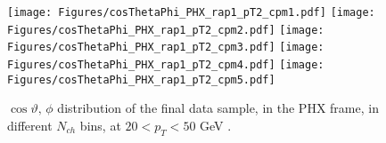 \documentclass[12pt]{article}
\newcommand{\pt}{$p_{\mathrm{T}}$}
\begin{document}
\begin{figure}[htbp]
\centering
\texttt{[image: Figures/cosThetaPhi\_PHX\_rap1\_pT2\_cpm1.pdf]}
\texttt{[image: Figures/cosThetaPhi\_PHX\_rap1\_pT2\_cpm2.pdf]}
\texttt{[image: Figures/cosThetaPhi\_PHX\_rap1\_pT2\_cpm3.pdf]}
\texttt{[image: Figures/cosThetaPhi\_PHX\_rap1\_pT2\_cpm4.pdf]}
\texttt{[image: Figures/cosThetaPhi\_PHX\_rap1\_pT2\_cpm5.pdf]}
\caption{$\cos\vartheta,\,\phi$ distribution of the final data sample, 
	in the PHX frame, in different $N_{ch}$ bins, at $20 < p_{T} < 50$ GeV .}
\end{figure}
\clearpage

\end{document}
